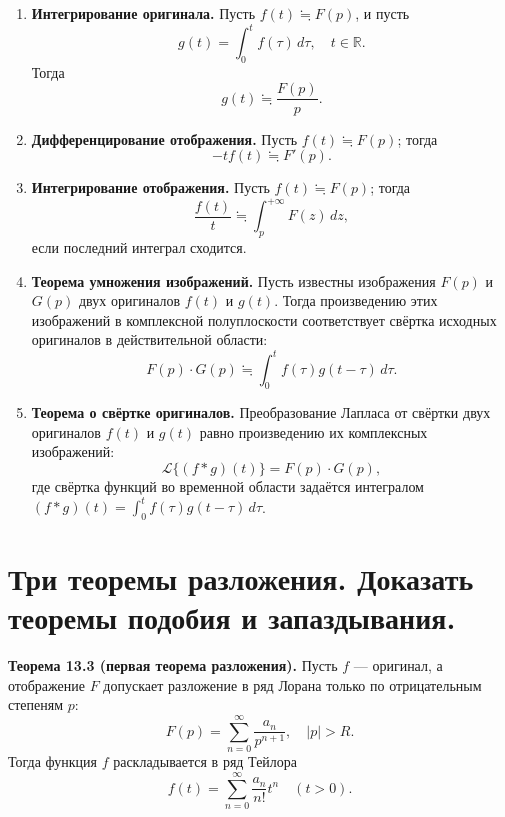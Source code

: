 \documentclass[12pt, a4paper]{article}
\theoremstyle{definition}
\theoremstyle{remark}
\begin{document}
\begin{enumerate}
	\item \textbf{Интегрирование оригинала.} Пусть $f(t) \fallingdotseq F(p)$, и пусть
	$$g(t) = \int_{0}^{t} f(\tau) \, d\tau, \quad t \in \mathbb{R}.$$
	Тогда
	$$g(t) \fallingdotseq \frac{F(p)}{p}.$$
	
	\item \textbf{Дифференцирование отображения.} Пусть $f(t) \fallingdotseq F(p)$; тогда
	$$-tf(t) \fallingdotseq F'(p).$$
	
	\item \textbf{Интегрирование отображения.} Пусть $f(t) \fallingdotseq F(p)$; тогда
	$$\frac{f(t)}{t} \fallingdotseq \int_{p}^{+\infty} F(z) \, dz,$$
	если последний интеграл сходится.
	
	\item \textbf{Теорема умножения изображений.} Пусть известны изображения $F(p)$ и $G(p)$ двух оригиналов $f(t)$ и $g(t)$. Тогда произведению этих изображений в комплексной полуплоскости соответствует свёртка исходных оригиналов в действительной области:
	$$F(p) \cdot G(p) \fallingdotseq \int_{0}^{t} f(\tau) g(t - \tau) \, d\tau.$$
	
	\item \textbf{Теорема о свёртке оригиналов.} Преобразование Лапласа от свёртки двух оригиналов $f(t)$ и $g(t)$ равно произведению их комплексных изображений:
	$$\mathcal{L}\{(f * g)(t)\} = F(p) \cdot G(p),$$
	где свёртка функций во временной области задаётся интегралом $(f * g)(t) = \int_{0}^{t} f(\tau) g(t - \tau) \, d\tau$.
\end{enumerate}

\newpage
\section{Три теоремы разложения. Доказать теоремы подобия и запаздывания.}

\textbf{Теорема 13.3 (первая теорема разложения).} Пусть $f$ --- оригинал, а отображение $F$ допускает разложение в ряд Лорана только по отрицательным степеням $p$:
\begin{equation}
	F(p) = \sum_{n=0}^{\infty} \frac{a_n}{p^{n+1}}, \quad |p| > R.
\end{equation}
Тогда функция $f$ раскладывается в ряд Тейлора
\begin{equation}
	f(t) = \sum_{n=0}^{\infty} \frac{a_n}{n!} t^n \quad (t > 0).
\end{equation}
\end{document}
